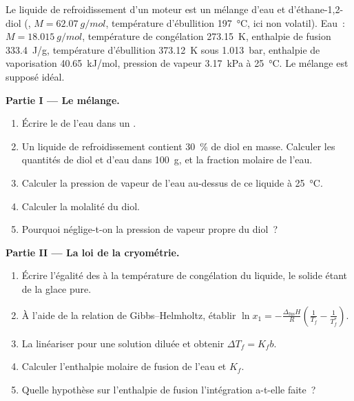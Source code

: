 \begin{problem}
\label{pb:b2:chemical-potential:1}
Le liquide de refroidissement d'un moteur est un mélange d'eau et d'éthane-1,2-diol
(, $M = \qty{62.07}{g/mol}$, température d'ébullition \qty{197}{\celsius},
ici non volatil). Eau~: $M = \qty{18.015}{g/mol}$, température de congélation
\qty{273.15}{K}, enthalpie de fusion \qty{333.4}{J/g}, température d'ébullition
\qty{373.12}{K} sous \qty{1.013}{bar}, enthalpie de vaporisation
\qty{40.65}{kJ/mol}, pression de vapeur \qty{3.17}{kPa} à \qty{25}{\celsius}.
Le mélange est supposé idéal.

\medskip
\noindent\textbf{Partie I --- Le mélange.}
\begin{enumerate}
  \item Écrire le  de l'eau dans un .
  \item Un liquide de refroidissement contient \qty{30}{\percent} de diol en masse. Calculer les
        quantités de diol et d'eau dans \qty{100}{g}, et la fraction molaire de
        l'eau.
  \item Calculer la pression de vapeur de l'eau au-dessus de ce liquide à
        \qty{25}{\celsius}.
  \item Calculer la molalité du diol.
  \item Pourquoi néglige-t-on la pression de vapeur propre du diol~?
\end{enumerate}

\medskip
\noindent\textbf{Partie II --- La loi de la cryométrie.}
\begin{enumerate}[resume]
  \item Écrire l'égalité des  à la température de congélation du
        liquide, le solide étant de la glace pure.
  \item À l'aide de la relation de Gibbs--Helmholtz, établir $\ln x_1 =
        -\frac{\Delta_{\text{fus}}H}{R}\left(\frac1{T_f} - \frac1{T_f^*}\right)$.
  \item La linéariser pour une solution diluée et obtenir $\Delta T_f = K_f b$.
  \item Calculer l'enthalpie molaire de fusion de l'eau et $K_f$.
  \item Quelle hypothèse sur l'enthalpie de fusion l'intégration a-t-elle
        faite~?
\end{enumerate}


\end{problem}
